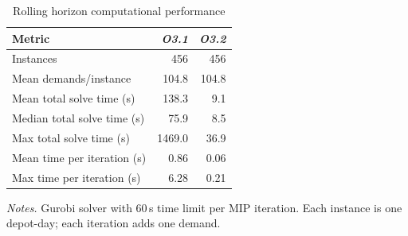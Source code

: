 \begin{table}[ht]
\centering
\caption{Rolling horizon computational performance}
\label{tab:rh_performance}
\begin{threeparttable}
\begin{tabular}{l rr}
\toprule
Metric & \textit{O3.1} & \textit{O3.2} \\
\midrule
Instances & 456 & 456 \\
Mean demands/instance & 104.8 & 104.8 \\
Mean total solve time (s) & 138.3 & 9.1 \\
Median total solve time (s) & 75.9 & 8.5 \\
Max total solve time (s) & 1469.0 & 36.9 \\
Mean time per iteration (s) & 0.86 & 0.06 \\
Max time per iteration (s) & 6.28 & 0.21 \\
\bottomrule
\end{tabular}
\begin{tablenotes}
\smaller
\item \textit{Notes.} Gurobi solver with 60\,s time limit per MIP iteration.
Each instance is one depot-day; each iteration adds one demand.
\end{tablenotes}
\end{threeparttable}
\end{table}

